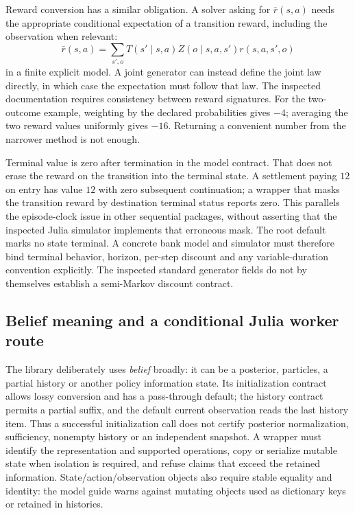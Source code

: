 Reward conversion has a similar obligation. A solver asking for
$\bar r(s,a)$ needs the appropriate conditional expectation of a transition
reward, including the observation when relevant:
\[
 \bar r(s,a)=\sum_{s',o}T(s'\mid s,a)Z(o\mid s,a,s')r(s,a,s',o)
\]
in a finite explicit model. A joint generator can instead define the joint law
directly, in which case the expectation must follow that law. The inspected
documentation requires consistency between reward signatures. For the
two-outcome example, weighting by the declared probabilities gives $-4$;
averaging the two reward values uniformly gives $-16$. Returning a convenient
number from the narrower method is not enough.
\citep{exec23_pomdpsjl_sources,exec23_pomdpsjl_reference}

Terminal value is zero after termination in the model contract. That does not
erase the reward on the transition into the terminal state. A settlement
paying $12$ on entry has value $12$ with zero subsequent continuation; a wrapper
that masks the transition reward by destination terminal status reports zero.
This parallels the episode-clock issue in other sequential packages, without
asserting that the inspected Julia simulator implements that erroneous mask.
The root default marks no state terminal. A concrete bank model and simulator
must therefore bind terminal behavior, horizon, per-step discount and any
variable-duration convention explicitly. The inspected standard generator
fields do not by themselves establish a semi-Markov discount contract.
\citep{exec23_pomdpsjl_sources,exec23_pomdpsjl_reference}

\subsection{Belief meaning and a conditional Julia worker route}
\label{exec23:pomdpsjl-decision}

The library deliberately uses \emph{belief} broadly: it can be a posterior,
particles, a partial history or another policy information state. Its
initialization contract allows lossy conversion and has a pass-through default;
the history contract permits a partial suffix, and the default current
observation reads the last history item. Thus a successful initialization call
does not certify posterior normalization, sufficiency, nonempty history or an
independent snapshot. A wrapper must identify the representation and supported
operations, copy or serialize mutable state when isolation is required, and
refuse claims that exceed the retained information. State/action/observation
objects also require stable equality and identity: the model guide warns
against mutating objects used as dictionary keys or retained in histories.
\citep{exec23_pomdpsjl_sources}

